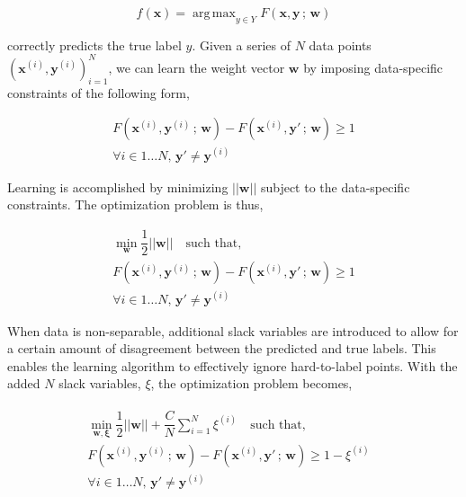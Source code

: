 \documentclass{article}
\DeclareMathOperator*{\argmax}{arg\,max}
\begin{document}
\begin{equation*}
f(\mathbf{x}) = \argmax_{y \in Y}F(\mathbf{x},\mathbf{y}\,;\,\mathbf{w})
\end{equation*}

correctly predicts the true label $y$. Given a series of $N$ data points
$(\mathbf{x}^{(i)}, \mathbf{y}^{(i)})_{i=1}^{N}$, we can learn the weight
vector $\mathbf{w}$ by imposing data-specific constraints of the following
form,

\begin{equation*}
\begin{split}
F(\mathbf{x}^{(i)}, \mathbf{y}^{(i)}\,;\,\mathbf{w}) -
F(\mathbf{x}^{(i)}, \mathbf{y}'\,;\,\mathbf{w}) \geq 1 \\
\forall i \in 1\dots N,\,\mathbf{y}' \neq \mathbf{y}^{(i)}
\end{split}
\end{equation*}

Learning is accomplished by minimizing $||\mathbf{w}||$ subject to the
data-specific constraints. The optimization problem is thus,

\[
\begin{split}
\min_{\mathbf{w}}\dfrac{1}{2}||\mathbf{w}||\quad\text{such that,} \\
F(\mathbf{x}^{(i)}, \mathbf{y}^{(i)}\,;\,\mathbf{w}) -
F(\mathbf{x}^{(i)}, \mathbf{y}'\,;\,\mathbf{w}) \geq 1 \\
\forall i \in 1\dots N, \,\mathbf{y}' \neq \mathbf{y}^{(i)}
\end{split}
\]

When data is non-separable, additional slack variables are introduced to allow
for a certain amount of disagreement between the predicted and true labels.
  This enables the learning algorithm to effectively ignore hard-to-label
  points. With the added $N$ slack variables, $\xi$, the optimization problem
  becomes,

\begin{align*}
\begin{split}
\min_{\mathbf{w, \xi}}\dfrac{1}{2}||\mathbf{w}|| +
\dfrac{C}{N}\sum_{i=1}^{N}\xi^{(i)}
\quad\text{such that,}&\\
F(\mathbf{x}^{(i)}, \mathbf{y}^{(i)}\,;\,\mathbf{w}) -
F(\mathbf{x}^{(i)}, \mathbf{y}'\,;\,\mathbf{w}) \geq 1 - \xi^{(i)} \\
\forall i \in 1\dots N, \,\mathbf{y}' \neq \mathbf{y}^{(i)}
\end{split}
\end{align*}
\end{document}
